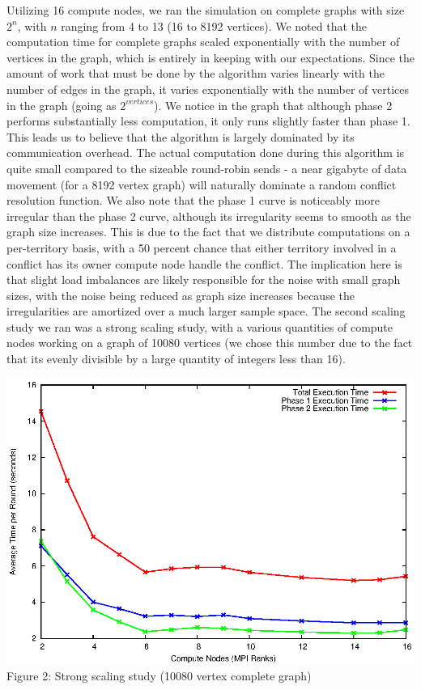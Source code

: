 \documentclass[10pt]{article}
\begin{document}
\begin{multicols}{2}
		Utilizing 16 compute nodes, we ran the simulation on complete graphs with size $2^{n}$, with $n$ ranging from 4 to 13 (16 to 8192 vertices). 
		We noted that the computation time for complete graphs scaled exponentially with the number of vertices in the graph, which is entirely in keeping with our expectations. 
		Since the amount of work that must be done by the algorithm varies linearly with the number of edges in the graph, it varies exponentially with the number of vertices in the graph (going as $2^{vertices}$). 
		We notice in the graph that although phase 2 performs substantially less computation, it only runs slightly faster than phase 1. 
		This leads us to believe that the algorithm is largely dominated by its communication overhead. 
		The actual computation done during this algorithm is quite small compared to the sizeable round-robin sends - a near gigabyte of data movement (for a 8192 vertex graph) will naturally dominate a random conflict resolution function.
		We also note that the phase 1 curve is noticeably more irregular than the phase 2 curve, although its irregularity seems to smooth as the graph size increases. 
		This is due to the fact that we distribute computations on a per-territory basis, with a 50 percent chance that either territory involved in a conflict has its owner compute node handle the conflict. 
		The implication here is that slight load imbalances are likely responsible for the noise with small graph sizes, with the noise being reduced as graph size increases because the irregularities are amortized over a much larger sample space.
		The second scaling study we ran was a strong scaling study, with a various quantities of compute nodes working on a graph of 10080 vertices (we chose this number due to the fact that its evenly divisible by a large quantity of integers less than 16). 
		\begin{center}
			\includegraphics[width=.45\textwidth]{ranks.eps}
			\small{Figure 2: Strong scaling study (10080 vertex complete graph)}
		\end{center}
		

\end{multicols}
\end{document}
